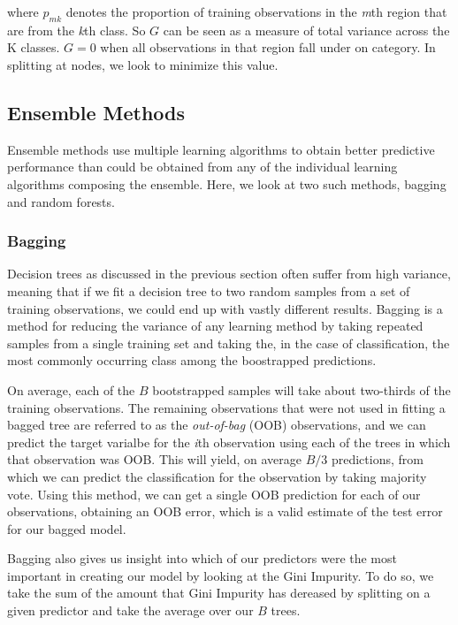 \documentclass[preprint,12pt]{elsarticle}
\begin{document}
\noindent where $\hat{p}_{mk}$ denotes the proportion of training observations in the \textit{m}th region that are from the \textit{k}th class. So $G$ can be seen as a measure of total variance across the K classes. $G = 0$ when all observations in that region fall under on category. In splitting at nodes, we look to minimize this value.

\subsection{Ensemble Methods}
Ensemble methods use multiple learning algorithms to obtain better predictive performance than could be obtained from any of the individual learning algorithms composing the ensemble. Here, we look at two such methods, bagging and random forests.
\subsubsection{Bagging}
Decision trees as discussed in the previous section often suffer from high variance, meaning that if we fit a decision tree to two random samples from a set of training observations, we could end up with vastly different results. Bagging is a method for reducing the variance of any learning method by taking repeated samples from a single training set and taking the, in the case of classification, the most commonly occurring class among the boostrapped predictions. 

On average, each of the $B$ bootstrapped samples will take about two-thirds of the training observations.  The remaining observations that were not used in fitting a bagged tree are referred to as the \textit{out-of-bag} (OOB) observations, and we can predict the target varialbe for the \textit{i}th observation using each of the trees in which that observation was OOB. This will yield, on average $B/3$ predictions, from which we can predict the classification for the observation by taking majority vote. Using this method, we can get a single OOB prediction for each of our observations, obtaining an OOB error, which is a valid estimate of the test error for our bagged model.

Bagging also gives us insight into which of our predictors were the most important in creating our model by looking at the Gini Impurity. To do so, we take the sum of the amount that Gini Impurity has dereased by splitting on a given predictor and take the average over our $B$ trees.
\end{document}
